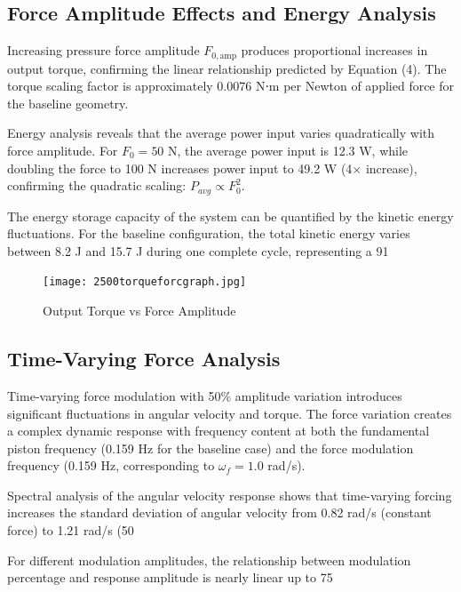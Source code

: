 \documentclass[10pt]{article}
\begin{document}
\subsection{Force Amplitude Effects and Energy Analysis}

Increasing pressure force amplitude \(F_{0,\text{amp}}\) produces proportional increases in output torque, confirming the linear relationship predicted by Equation (4). The torque scaling factor is approximately 0.0076 N⋅m per Newton of applied force for the baseline geometry.

Energy analysis reveals that the average power input varies quadratically with force amplitude. For $F_0 = 50$ N, the average power input is 12.3 W, while doubling the force to 100 N increases power input to 49.2 W (4× increase), confirming the quadratic scaling: $P_{avg} \propto F_0^2$.

The energy storage capacity of the system can be quantified by the kinetic energy fluctuations. For the baseline configuration, the total kinetic energy varies between 8.2 J and 15.7 J during one complete cycle, representing a 91%

\begin{figure}[H]
    \centering
    \texttt{[image: 2500torqueforcgraph.jpg]}
    \caption{Output Torque vs Force Amplitude}
\end{figure}

\subsection{Time-Varying Force Analysis}

Time-varying force modulation with 50\% amplitude variation introduces significant fluctuations in angular velocity and torque. The force variation creates a complex dynamic response with frequency content at both the fundamental piston frequency (0.159 Hz for the baseline case) and the force modulation frequency (0.159 Hz, corresponding to \(\omega_f = 1.0\) rad/s).

Spectral analysis of the angular velocity response shows that time-varying forcing increases the standard deviation of angular velocity from 0.82 rad/s (constant force) to 1.21 rad/s (50%

For different modulation amplitudes, the relationship between modulation percentage and response amplitude is nearly linear up to 75%
\end{document}

